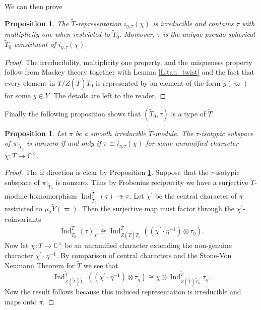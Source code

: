 \documentclass[10pt, letterpaper]{amsart}
\theoremstyle{plain}
\newtheorem{Prop}[equation]{Proposition}
\theoremstyle{definition}
\numberwithin{equation}{section}
\newcommand{\yt}{\tilde{y}}
\newcommand{\Tt}{\widetilde{T}}
\newcommand{\Yt}{\widetilde{Y}}
\newcommand{\Ind}{\operatorname{Ind}}
\begin{document}
We can then prove

\begin{Prop}\label{IndTau}
The $\Tt$-representation $i_{\eta,\tau}(\chi)$ is irreducible and contains $\tau$ with multiplicity one when restricted to $\Tt_0$. Moreover, $\tau$ is the unique pseudo-spherical $\Tt_{0}$-constituent of $i_{\eta,\tau}(\chi)$. 
\end{Prop}	
\begin{proof}
The irreducibility, multiplicity one property, and the uniqueness property follow from Mackey theory together with Lemma \ref{L:tau_twist} and the fact that every element in $\Tt\slash Z(\Tt)\Tt_0$ is represented by an element of the form $\yt(\varpi)$ for some $y\in Y$. The details are left to the reader.
\end{proof}

Finally the following proposition shows that $(\Tt_{0},\tau)$ is a type of $\Tt$.

\begin{Prop}\label{TTypes}
Let $\pi$ be a smooth irreducible $\Tt$-module. The $\tau$-isotypic subspace of $\pi|_{\Tt_{0}}$ is nonzero if and only if $\pi\cong i_{\eta,\tau}(\chi)$ for some unramified character $\chi:T\rightarrow \mathbb{C}^{\times}$.
\end{Prop}
\begin{proof}
	The if direction is clear by Proposition \ref{IndTau}.
    Suppose that the $\tau$-isotypic subspace of $\pi|_{\Tt_{0}}$ is nonzero. Thus by Frobenius reciprocity we have a surjective $\Tt$-module homomorphism $\Ind_{\Tt_{0}}^{\Tt}(\tau)\twoheadrightarrow \pi$. Let $\chi^{\prime}$ be the central character of $\pi$ restricted to $\mu_{2}\Yt(\varpi)$. Then the surjective map must factor through the $\chi^{\prime}$-coinvariants 
    \[
    \Ind_{\Tt_{0}}^{\Tt}(\tau)_{\chi^{\prime}}\cong \Ind_{Z(\Tt)\Tt_{0}}^{\Tt}((\chi^{\prime}\cdot \eta^{-1})\otimes \tau_{\eta}).
    \]
    Now let $\chi:T\rightarrow \mathbb{C}^{\times}$ be an unramified character extending the non-genuine character $\chi^{\prime}\cdot \eta^{-1}$. By comparison of central characters and the Stone-Von Neumann Theorem for $\Tt$ we see that 
	\begin{equation*}
		\Ind_{Z(\Tt)\Tt_{0}}^{\Tt}((\chi^{\prime}\cdot \eta^{-1})\otimes \tau_{\eta})\cong \chi\otimes \Ind_{Z(\Tt)\Tt_{0}}^{\Tt}\tau_{\eta}.
	\end{equation*}
	Now the result follows because this induced representation is irreducible and maps onto $\pi$.
\end{proof}
\end{document}
